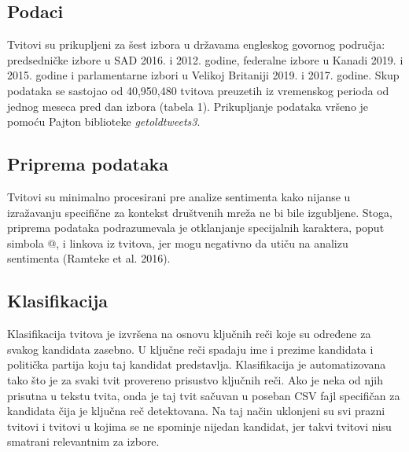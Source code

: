\subsection{Podaci}

Tvitovi su prikupljeni za šest izbora u državama engleskog govornog područja: predsedničke izbore u SAD 2016. i 2012. godine, federalne izbore u Kanadi 2019. i 2015. godine i parlamentarne izbori u Velikoj Britaniji 2019. i 2017. godine. Skup podataka se sastojao od 40,950,480 tvitova preuzetih iz vremenskog perioda od jednog meseca pred dan izbora (tabela 1). Prikupljanje podataka vršeno je pomoću Pajton biblioteke \emph{getoldtweets3}.


\subsection{Priprema podataka}

Tvitovi su minimalno procesirani pre analize sentimenta kako nijanse u izražavanju specifične za kontekst društvenih mreža ne bi bile izgubljene. Stoga, priprema podataka podrazumevala je otklanjanje specijalnih karaktera, poput simbola @, i linkova iz tvitova, jer mogu negativno da utiču na analizu sentimenta (Ramteke et al. 2016). 

\subsection{Klasifikacija}

Klasifikacija tvitova je izvršena na osnovu ključnih reči koje su određene za svakog kandidata zasebno. U ključne reči spadaju ime i prezime kandidata i politička partija koju taj kandidat predstavlja. Klasifikacija je automatizovana tako što je za svaki tvit provereno prisustvo ključnih reči. Ako je neka od njih prisutna u tekstu tvita, onda je taj tvit sačuvan u poseban CSV fajl specifičan za kandidata čija je ključna reč detektovana. Na taj način uklonjeni su svi prazni tvitovi i tvitovi u kojima se ne spominje nijedan kandidat, jer takvi tvitovi nisu smatrani relevantnim za izbore.

